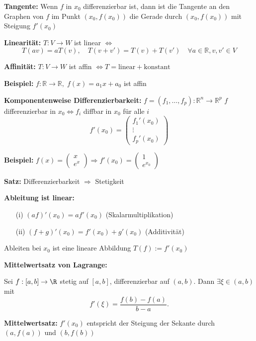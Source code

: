 \begin{itemize}
\textbf{Tangente:}  
Wenn \(f\) in \(x_0\) differenzierbar ist, dann ist die Tangente an den Graphen von \(f\) im Punkt \((x_0, f(x_0))\)  
die Gerade durch \((x_0, f(x_0))\) mit Steigung \(f'(x_0)\)

\textbf{Linearität:}  
\(T: V \to W\) ist linear \(\Leftrightarrow\)  
\[
T(av) = aT(v), \quad T(v + v') = T(v) + T(v')\quad \forall a \in \mathbb{R}, v, v' \in V
\]

\textbf{Affinität:}  
\(T: V \to W\) ist affin \(\Leftrightarrow T = \text{linear} + \text{konstant}\)

\textbf{Beispiel:} \(f: \mathbb{R} \to \mathbb{R},\; f(x) = a_1 x + a_0\) ist affin

\textbf{Komponentenweise Differenzierbarkeit:}  
\(f = (f_1, \dots, f_p): \mathbb{R}^n \to \mathbb{R}^p\)  
\(f\) differenzierbar in \(x_0 \Leftrightarrow f_i\) diffbar in \(x_0\) für alle \(i\)  
\[
f'(x_0) = \begin{pmatrix} f_1'(x_0) \\ \vdots \\ f_p'(x_0) \end{pmatrix}
\]

\textbf{Beispiel:} \(f(x) = \begin{pmatrix} x \\ e^x \end{pmatrix} \Rightarrow f'(x_0) = \begin{pmatrix} 1 \\ e^{x_0} \end{pmatrix}\)

\textbf{Satz:}  
Differenzierbarkeit \(\Rightarrow\) Stetigkeit

\textbf{Ableitung ist linear:}
\begin{itemize}
  \item[(i)] \( (a f)'(x_0) = a f'(x_0) \) \quad (Skalarmultiplikation)
  \item[(ii)] \( (f + g)'(x_0) = f'(x_0) + g'(x_0) \) \quad (Additivität)
\end{itemize}
Ableiten bei \(x_0\) ist eine lineare Abbildung \(T(f) := f'(x_0)\)

\textbf{Mittelwertsatz von Lagrange:}
\begin{theorem}
  Sei $f:[a,b]\to\R$ stetig auf $[a,b]$, differenzierbar auf $(a,b)$. Dann $\exists\xi\in(a,b)$ mit
  \[
    f'(\xi) = \frac{f(b)-f(a)}{b-a}.
  \]
\end{theorem}

\textbf{Mittelwertsatz:}  
\(f'(x_0)\) entspricht der Steigung der Sekante durch \((a, f(a))\) und \((b, f(b))\)


\end{itemize}
